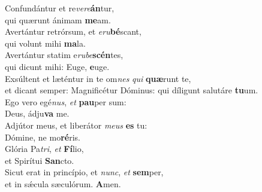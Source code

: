 \evenverse Confundántur et re\textit{ve}\textit{re}\textbf{án}tur,~\*\\
\evenverse qui quærunt ánimam \textbf{me}am.\\
\oddverse Avertántur retrórsum, et \textit{e}\textit{ru}\textbf{bé}scant,~\*\\
\oddverse qui volunt mihi \textbf{ma}la.\\
\evenverse Avertántur statim e\textit{ru}\textit{be}\textbf{scén}tes,~\*\\
\evenverse qui dicunt mihi: Euge, \textbf{e}uge.\\
\oddverse Exsúltent et læténtur in te om\textit{nes} \textit{qui} \textbf{quæ}runt te,~\*\\
\oddverse et dicant semper: Magnificétur Dóminus: qui díligunt salutáre \textbf{tu}um.\\
\evenverse Ego vero egé\textit{nus}, \textit{et} \textbf{pau}per sum:~\*\\
\evenverse Deus, ádju\textbf{va} me.\\
\oddverse Adjútor meus, et liberátor \textit{me}\textit{us} \textbf{es} tu:~\*\\
\oddverse Dómine, ne mo\textbf{ré}ris.\\
\evenverse Glória Pa\textit{tri}, \textit{et} \textbf{Fí}lio,~\*\\
\evenverse et Spirítui \textbf{San}cto.\\
\oddverse Sicut erat in princípio, et \textit{nunc}, \textit{et} \textbf{sem}per,~\*\\
\oddverse et in sǽcula sæculórum. \textbf{A}men.\\
